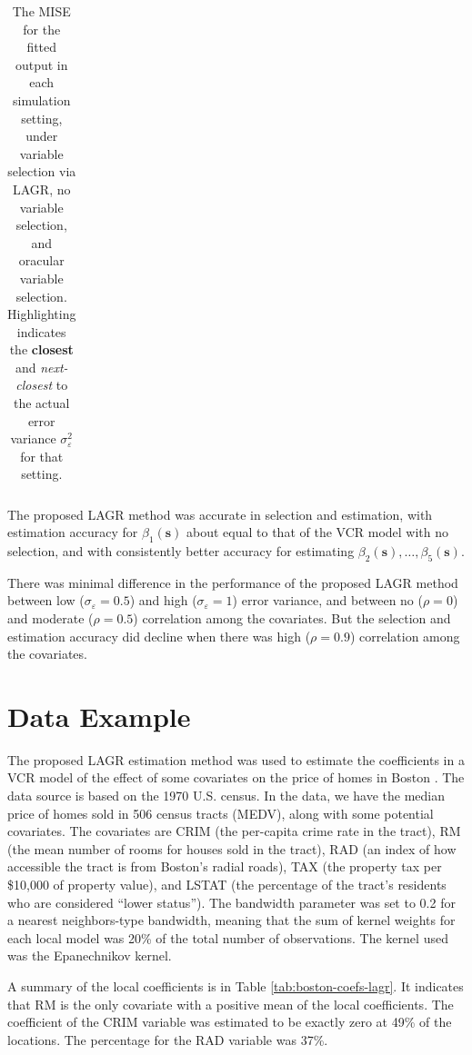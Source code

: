 \documentclass[authoryear,review, 12pt]{elsarticle}
\begin{document}
\begin{table}
\begin{tabular}{ccc|c|ccc}
	\end{tabular}
	\caption{The MISE for the fitted output in each simulation setting, under variable selection via LAGR, no variable selection, and oracular variable selection. Highlighting indicates the \textbf{closest} and \emph{next-closest} to the actual error variance $\sigma_\varepsilon^2$ for that setting.}
	\label{tab:misey}
\end{table}

The proposed LAGR method was accurate in selection and estimation,
with estimation accuracy for $\beta_{1}(\bm{s})$ about equal to that
of the VCR model with no selection, and with consistently better accuracy
for estimating $\beta_{2}(\bm{s}),\dots,\beta_{5}(\bm{s})$.

There was minimal difference in the performance of the proposed LAGR
method between low ($\sigma_{\varepsilon}=0.5$) and high ($\sigma_{\varepsilon}=1$)
error variance, and between no ($\rho=0$) and moderate ($\rho=0.5$)
correlation among the covariates. But the selection and estimation
accuracy did decline when there was high ($\rho=0.9$) correlation
among the covariates.


\section{Data Example\label{sec:example}}




The proposed LAGR estimation method was used to estimate the coefficients
in a VCR model of the effect of some covariates on the price of homes
in Boston \citep{Harrison-Rubinfeld-1978,Gilley-Pace-1996,Pace-Gilley-1997}.
The data source is based on the 1970 U.S. census. In the data, we
have the median price of homes sold in 506 census tracts (MEDV), along
with some potential covariates. The covariates are CRIM (the per-capita
crime rate in the tract), RM (the mean number of rooms for houses
sold in the tract), RAD (an index of how accessible the tract is from
Boston's radial roads), TAX (the property tax per \$10,000 of property
value), and LSTAT (the percentage of the tract's residents who are
considered ``lower status''). The bandwidth parameter was set to
0.2 for a nearest neighbors-type bandwidth, meaning that the sum of
kernel weights for each local model was 20\% of the total number of
observations. The kernel used was the Epanechnikov kernel.

A summary of the local coefficients is in Table \ref{tab:boston-coefs-lagr}.
It indicates that RM is the only covariate with a positive mean of
the local coefficients. The coefficient of the CRIM variable was estimated
to be exactly zero at 49\%
of the locations. The percentage for the RAD variable was 37\%.
\end{document}
